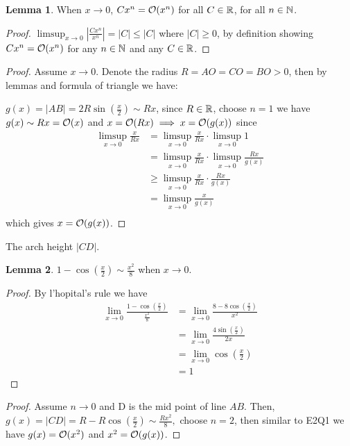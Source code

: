 \documentclass{homework}
\newcommand{\R}{\bb{R}} %
\newcommand{\N}{\bb{N}} %
\newcommand{\?}{\stackrel{?}{=}}
\theoremstyle{definition}
\newtheorem*{lemma}{Lemma}
\begin{document}
\begin{lemma}
    When $x\to0$, $Cx^n=\cal{O}(x^n)$ for all $C\in\R$, for all $n\in\N$. 

    \begin{proof}
        $\limsup_{x\to0}|\frac{Cx^n}{x^n}|=|C|\leq |C|$ where $|C|\geq0$, by definition showing $Cx^n=\cal{O}(x^n)$ for any $n\in\N$ and any $C\in\R$.
    \end{proof}
\end{lemma}

\begin{proof}
    Assume $x\to0$. Denote the radius $R=AO=CO=BO>0$, then by lemmas and formula of triangle we have:

    \(g(x)=|AB|=2R\sin(\frac{x}2)\sim Rx\), since $R\in\R$, choose $n=1$ we have \(g(x)\sim Rx=\cal{O}(x)\) and $x=\cal{O}(Rx)\implies x=\cal{O}(g(x))$ since \begin{align*}
        \limsup_{x\to0}\frac{x}{Rx}&=\limsup_{x\to0}\frac{x}{Rx}\cdot\limsup_{x\to0}1\\
        &=\limsup_{x\to0}\frac{x}{Rx}\cdot\limsup_{x\to0}\frac{Rx}{g(x)}\\
        &\geq\limsup_{x\to0}\frac{x}{Rx}\cdot\frac{Rx}{g(x)}\\
        &=\limsup_{x\to0}\frac{x}{g(x)}\\
    \end{align*} which gives $x=\cal{O}(g(x))$.
\end{proof}

\question[2] The arch height $|CD|$.

\begin{lemma}
    $1-\cos(\frac{x}2)\sim \frac{x^2}8$ when $x\to0$.

    \begin{proof}
        By l'hopital's rule we have \begin{align*}
            \lim_{x\to0}\frac{1-\cos(\frac{x}2)}{\frac{x^2}8}&=\lim_{x\to0}\frac{8-8\cos(\frac{x}2)}{x^2}\\
            &=\lim_{x\to0}\frac{4\sin(\frac{x}2)}{2x}\\
            &=\lim_{x\to0}\cos(\frac{x}2)\\
            &=1
        \end{align*}
    \end{proof}
\end{lemma}

\begin{proof}
    Assume $n\to0$ and D is the mid point of line $AB$. Then, $g(x)=|CD|=R-R\cos(\frac{x}2)\sim \frac{Rx^2}{8},$ choose $n=2$, then similar to E2Q1 we have $g(x)=\cal{O}(x^2)$ and $x^2=\cal{O}(g(x))$. 
\end{proof}
\end{document}
